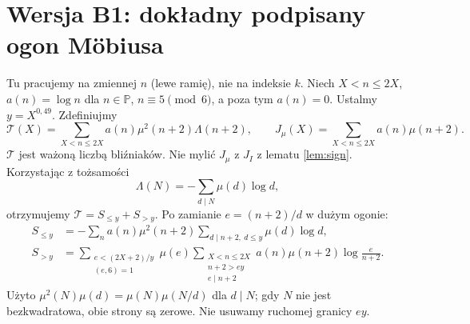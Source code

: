 \documentclass[11pt,a4paper]{article}
\theoremstyle{definition}\newtheorem{defn}[tw]{Definicja}
\theoremstyle{remark}\newtheorem*{uw}{Uwaga}
\newcommand{\Pp}{\mathbb P}
\newcommand{\T}{\mathcal T}
\begin{document}
\section{Wersja B1: dokładny podpisany ogon Möbiusa}\label{sec:B1}
Tu pracujemy na zmiennej $n$ (lewe ramię), nie na indeksie $k$.
Niech $X<n\le2X$, $a(n)=\log n$ dla $n\in\Pp$, $n\equiv5\pmod6$,
a poza tym $a(n)=0$. Ustalmy $y=X^{0{,}49}$. Zdefiniujmy
\[
 \T(X)=\sum_{X<n\le2X}a(n)\mu^2(n+2)\Lambda(n+2),\qquad
 J_\mu(X)=\sum_{X<n\le2X}a(n)\mu(n+2).
\]
$\T$ jest ważoną liczbą bliźniaków. Nie mylić $J_\mu$ z $J_I$ z
lematu \ref{lem:sign}. Korzystając z tożsamości
\[\Lambda(N)=-\sum_{d\mid N}\mu(d)\log d,\]
otrzymujemy $\T=S_{\le y}+S_{>y}$. Po zamianie $e=(n+2)/d$ w dużym ogonie:
\begin{align}
 S_{\le y}&=-\sum_n a(n)\mu^2(n+2)\sum_{d\mid n+2,\ d\le y}\mu(d)\log d,\nonumber\\
 S_{>y}&=\sum_{\substack{e<(2X+2)/y\\(e,6)=1}}\mu(e)
 \sum_{\substack{X<n\le2X\\n+2>ey\\e\mid n+2}}
 a(n)\mu(n+2)\log\frac e{n+2}.\label{eq:large}
\end{align}
Użyto $\mu^2(N)\mu(d)=\mu(N)\mu(N/d)$ dla $d\mid N$; gdy $N$ nie jest
bezkwadratowa, obie strony są zerowe. Nie usuwamy ruchomej granicy $ey$.
\end{document}
